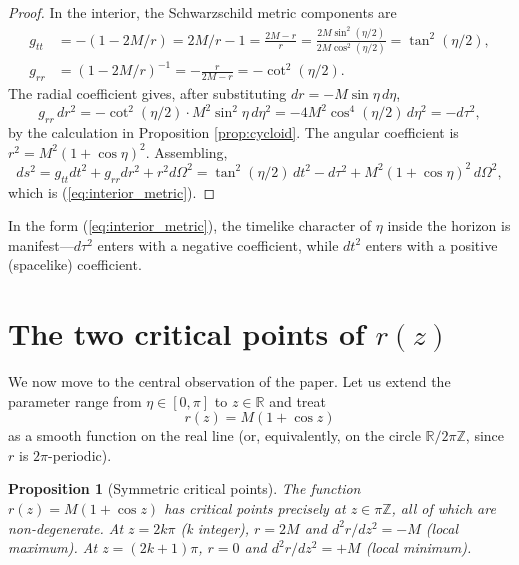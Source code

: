 \documentclass[11pt,a4paper]{article}
\newtheorem{proposition}[theorem]{Proposition}
\theoremstyle{definition}
\begin{document}
\begin{proof}
In the interior, the Schwarzschild metric components are
\begin{align}
g_{tt} &= -(1 - 2M/r) = 2M/r - 1 = \frac{2M - r}{r} = \frac{2M\sin^2(\eta/2)}{2M\cos^2(\eta/2)} = \tan^2(\eta/2), \\
g_{rr} &= (1 - 2M/r)^{-1} = -\frac{r}{2M - r} = -\cot^2(\eta/2).
\end{align}
The radial coefficient gives, after substituting $dr = -M\sin\eta\, d\eta$,
\begin{equation}
g_{rr}\, dr^2 = -\cot^2(\eta/2) \cdot M^2\sin^2\eta\, d\eta^2 = -4M^2\cos^4(\eta/2)\, d\eta^2 = -d\tau^2,
\end{equation}
by the calculation in Proposition \ref{prop:cycloid}. The angular coefficient is $r^2 = M^2(1+\cos\eta)^2$. Assembling,
\begin{equation}
ds^2 = g_{tt} dt^2 + g_{rr} dr^2 + r^2 d\Omega^2 = \tan^2(\eta/2)\, dt^2 - d\tau^2 + M^2(1+\cos\eta)^2\, d\Omega^2,
\end{equation}
which is (\ref{eq:interior_metric}).
\end{proof}

In the form (\ref{eq:interior_metric}), the timelike character of $\eta$ inside the horizon is manifest---$d\tau^2$ enters with a negative coefficient, while $dt^2$ enters with a positive (spacelike) coefficient.

\section{The two critical points of \texorpdfstring{$r(z)$}{r(z)}}\label{sec:critical}

We now move to the central observation of the paper. Let us extend the parameter range from $\eta \in [0, \pi]$ to $z \in \mathbb{R}$ and treat
\begin{equation}\label{eq:rz}
r(z) = M(1 + \cos z)
\end{equation}
as a smooth function on the real line (or, equivalently, on the circle $\mathbb{R}/2\pi\mathbb{Z}$, since $r$ is $2\pi$-periodic).

\begin{proposition}[Symmetric critical points]\label{prop:critical}
The function $r(z) = M(1+\cos z)$ has critical points precisely at $z \in \pi\mathbb{Z}$, all of which are non-degenerate. At $z = 2k\pi$ (k integer), $r = 2M$ and $d^2r/dz^2 = -M$ (local maximum). At $z = (2k+1)\pi$, $r = 0$ and $d^2r/dz^2 = +M$ (local minimum).
\end{proposition}
\end{document}
